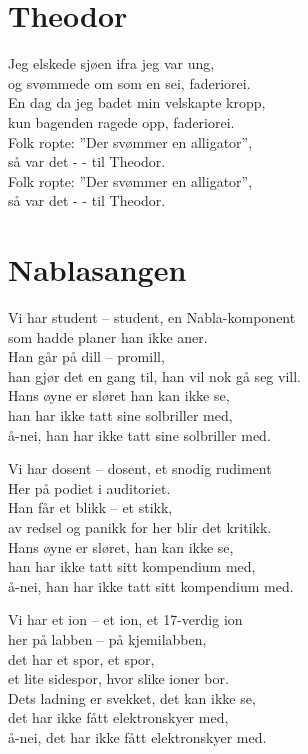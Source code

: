 \documentclass{article}
\begin{document}
\begin{landscape}
\begin{multicols}{3}
\begin{center}
\columnbreak
\section*{Theodor}
Jeg elskede sjøen ifra jeg var ung,\\
og svømmede om som en sei, faderiorei.\\
En dag da jeg badet min velskapte kropp,\\
kun bagenden ragede opp, faderiorei.\\
Folk ropte: ”Der svømmer en alligator”,\\
så var det - - til Theodor.\\
Folk ropte: ”Der svømmer en alligator”,\\
så var det - - til Theodor.\\


\section*{Nablasangen}
Vi har student -- student, en Nabla-komponent\\
som hadde planer han ikke aner.\\
Han går på dill -- promill,\\
han gjør det en gang til, han vil nok gå seg vill.\\
Hans øyne er sløret han kan ikke se,\\
han har ikke tatt sine solbriller med,\\
å-nei, han har ikke tatt sine solbriller med.\\

\medskip

Vi har dosent -- dosent, et snodig rudiment\\
Her på podiet i auditoriet.\\
Han får et blikk -- et stikk,\\
av redsel og panikk for her blir det kritikk.\\
Hans øyne er sløret, han kan ikke se,\\
han har ikke tatt sitt kompendium med,\\
å-nei, han har ikke tatt sitt kompendium med.\\

\medskip

Vi har et ion -- et ion, et 17-verdig ion\\
her på labben -- på kjemilabben,\\
det har et spor, et spor,\\
et lite sidespor, hvor slike ioner bor.\\
Dets ladning er svekket, det kan ikke se,\\
det har ikke fått elektronskyer med,\\
å-nei, det har ikke fått elektronskyer med.\\


\end{center}
\end{multicols}
\end{landscape}
\end{document}
